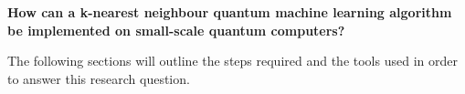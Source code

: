 \centering\textbf{How can a k-nearest neighbour quantum machine learning algorithm be implemented on small-scale quantum computers?}


\justify
The following sections will outline the steps required and the tools used in order to answer this research question. 
